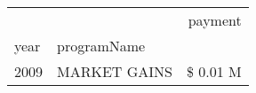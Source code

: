 \begin{tabular}{llr}
\toprule
 &  & payment \\
year & programName &  \\
\midrule
2009 & MARKET GAINS & \$ 0.01 M \\
\cline{1-3}
\bottomrule
\end{tabular}
